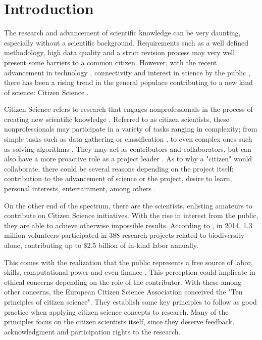 \chapter*[Introduction]{Introduction}

The research and advancement of scientific knowledge can be very daunting, especially without a scientific background. Requirements such as a well defined methodology, high data quality and a strict revision process may very well present some barriers to a common citizen. However, with the recent advancement in technology \cite{newman2012future}, connectivity \cite{newman2012future} and interest in science by the public \cite{silvertown2009new}, there has been a rising trend in the general populace contributing to a new kind of science: Citizen Science \cite{mckinley2017citizen}.

Citizen Science refers to research that engages nonprofessionals in the process of creating new scientific knowledge \cite{bonney2014next}. Referred to as citizen scientists, these nonprofessionals may participate in a variety of tasks ranging in complexity; from simple tasks such as data gathering or classification \cite{barker2013pascal}, to even complex ones such as solving algorithms \cite{cooper2010predicting}. They may act as contributors and collaborators, but can also have a more proactive role as a project leader \cite{robinson2018ten}. As to why a "citizen" would collaborate, there could be several reasons depending on the project itself: contribution to the advancement of science or the project, desire to learn, personal interests, entertainment, among others \cite{tinati2016because}. 

On the other end of the spectrum, there are the scientists, enlisting amateurs to contribute on Citizen Science initiatives. With the rise in interest from the public, they are able to achieve otherwise impossible results. According to \cite{theobald2015global}, in 2014, 1.3 million volunteers participated in 388 research projects related to biodiversity alone, contributing up to \$2.5 billion of in-kind labor annually.

This comes with the realization that the public represents a free source of labor, skills, computational power and even finance \cite{silvertown2009new}. This perception could implicate in ethical concerns depending on the role of the contributor. With these among other concerns, the European Citizen Science Association conceived the "Ten principles of citizen science". They establish some key principles to follow as good practice when applying citizen science concepts to research. Many of the principles focus on the citizen scientists itself, since they deserve feedback, acknowledgment and participation rights to the research.

